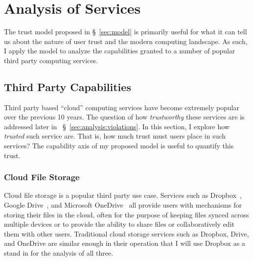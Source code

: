 \section{Analysis of Services}
\label{sec:analysis}

The trust model proposed in \S~\ref{sec:model} is primarily useful for
what it can tell us about the nature of user trust and the modern
computing landscape. As such, I apply the model to analyze the
capabilities granted to a number of popular third party computing
services.

\subsection{Third Party Capabilities}
\label{sec:analysis:capabilites}

Third party based ``cloud'' computing services have become extremely
popular over the previous 10 years.  The question of how
\textit{trustworthy} these services are is addressed later in
~\S~\ref{sec:analysis:violations}. In this section, I explore how
\textit{trusted} such service are. That is, how much trust must users
place in such services? The capability axis of my proposed model is
useful to quantify this trust.

\subsubsection{Cloud File Storage}

Cloud file storage is a popular third party use case. Services such as
Dropbox~\cite{dropbox}, Google Drive~\cite{google-drive}, and
Microsoft OneDrive~\cite{microsoft-onedrive} all provide users with
mechanisms for storing their files in the cloud, often for the purpose
of keeping files synced across multiple devices or to provide the
ability to share files or collaboratively edit them with other
users. Traditional cloud storage services such as Dropbox, Drive, and
OneDrive are similar enough in their operation that I will use Dropbox
as a stand in for the analysis of all three.

